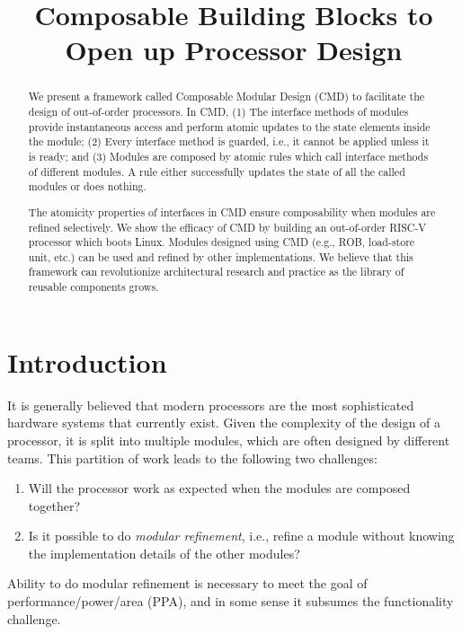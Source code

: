 \documentclass[conference]{IEEEtran}
\begin{document}
\title{Composable Building Blocks to Open up Processor Design}

\author{
}

\maketitle

\thispagestyle{plain}
\pagestyle{plain}

\begin{abstract}
    We present a framework called Composable Modular Design (CMD) to facilitate the design of out-of-order processors. In CMD, (1) The interface methods of modules provide instantaneous access and perform atomic updates to the state elements inside the module; (2) Every interface method is guarded, i.e., it cannot be applied unless it is ready; and (3) Modules are composed by atomic rules which call interface methods of different modules. A rule either successfully updates the state of all the called modules or does nothing.
    
    The atomicity properties of interfaces in CMD ensure composability when modules are refined selectively. We show the efficacy of CMD by building an out-of-order RISC-V processor which boots Linux. Modules designed using CMD (e.g., ROB, load-store unit, etc.) can be used and refined by other implementations. We believe that this framework can revolutionize architectural research and practice as the library of reusable components grows.
\end{abstract}

\section{Introduction}\label{sec:intro}
It is generally believed that modern processors are the most sophisticated hardware systems that currently exist.
Given the complexity of the design of a processor, it is split into multiple modules, which are often designed by different teams.
This partition of work leads to the following two challenges:
\begin{enumerate}
    \item Will the processor work as expected when the modules are composed together?
    \item Is it possible to do \emph{modular refinement}, i.e., refine a module without knowing the implementation details of the other modules?
\end{enumerate}
Ability to do modular refinement is necessary to meet the goal of performance/power/area (PPA), and in some sense it subsumes the functionality challenge. 
\end{document}
